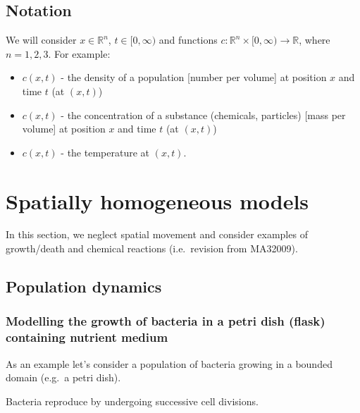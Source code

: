 \documentclass[
  letterpaper,
  DIV=11,
  numbers=noendperiod]{scrreprt}
\providecommand{\tightlist}{%
  \setlength{\itemsep}{0pt}\setlength{\parskip}{0pt}}\usepackage{longtable,booktabs,array}
\theoremstyle{plain}
\theoremstyle{definition}
\theoremstyle{plain}
\theoremstyle{remark}
\begin{document}
\hypertarget{notation}{%
\subsection{Notation}\label{notation}}

We will consider \(x \in \mathbb R^n\), \(t \in [0, \infty)\) and
functions \(c: \mathbb R^n \times [0, \infty) \to \mathbb R\), where
\(n=1,2,3\). For example:

\begin{itemize}
\tightlist
\item
  \(c(x,t)\) - the density of a population {[}number per volume{]} at
  position \(x\) and time \(t\) (at \((x,t)\))
\item
  \(c(x,t)\) - the concentration of a substance (chemicals, particles)
  {[}mass per volume{]} at position \(x\) and time \(t\) (at \((x,t)\))
\item
  \(c(x,t)\) - the temperature at \((x,t)\).
\end{itemize}

\hypertarget{spatially-homogeneous-models}{%
\section{Spatially homogeneous
models}\label{spatially-homogeneous-models}}

In this section, we neglect spatial movement and consider examples of
growth/death and chemical reactions (i.e.~revision from MA32009).

\hypertarget{population-dynamics}{%
\subsection{Population dynamics}\label{population-dynamics}}

\hypertarget{modelling-the-growth-of-bacteria-in-a-petri-dish-flask-containing-nutrient-medium}{%
\subsubsection{Modelling the growth of bacteria in a petri dish (flask)
containing nutrient
medium}\label{modelling-the-growth-of-bacteria-in-a-petri-dish-flask-containing-nutrient-medium}}

As an example let's consider a population of bacteria growing in a
bounded domain (e.g.~a petri dish).

Bacteria reproduce by undergoing successive cell divisions.
\end{document}
